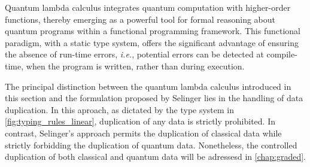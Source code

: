 
Quantum lambda calculus integrates quantum computation with higher-order functions, thereby emerging as a powerful tool for formal reasoning about quantum programs within a functional programming framework. This functional paradigm, with a static type system, offers the significant advantage of ensuring the absence of run-time errors, \textit{i.e.}, potential errors can be detected at compile-time, when the program is written, rather than during execution.

The principal distinction between the quantum lambda calculus introduced in this section and the formulation proposed by Selinger \cite{selinger2006lambda,selinger2009quantum} lies in the handling of data duplication. In this aproach, as dictated by the type system in \autoref{fig:typing_rules_linear}, duplication of any data is strictly prohibited. In contrast, Selinger's approach permits the duplication of classical data while strictly forbidding the duplication of quantum data.
Nonetheless, the controlled duplication of both classical and quantum data will be adressesd in \autoref{chap:graded}.




